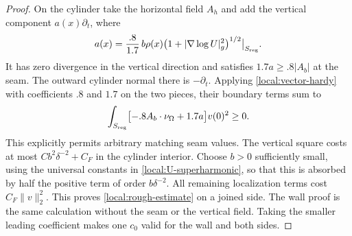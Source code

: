 \begin{proof}
On the cylinder take the horizontal field $A_h$ and add the vertical
component $a(x)\partial_t$, where
\[
 a(x)=\frac{.8}{1.7}\,b\rho(x)
               \bigl(1+|\nabla\log U|_g^2\bigr)^{1/2}
                 \big|_{S_{\rm reg}}.
\]
It has zero divergence in the vertical direction and satisfies
$1.7a\ge .8|A_b|$ at the seam.  The outward cylinder normal there is
$-\partial_t$.  Applying \eqref{local:vector-hardy} with coefficients
$.8$ and $1.7$ on the two pieces, their boundary terms sum to
\[
 \int_{S_{\rm reg}}
       \bigl[-.8 A_b\cdot\nu_\Omega+1.7a\bigr]v(0)^2\ge0.
\]
This explicitly permits arbitrary matching seam values.  The
vertical square costs at most $C b^2\delta^{-2}+C_F$ in the
cylinder interior.  Choose $b>0$ sufficiently small, using the
universal constants in \eqref{local:U-superharmonic}, so that this
is absorbed by half the positive term of order $b\delta^{-2}$.
All remaining localization terms cost $C_F\|v\|_2^2$.
This proves \eqref{local:rough-estimate} on a joined side.  The
wall proof is the same calculation without the seam or the vertical
field.  Taking the smaller leading coefficient makes one $c_0$
valid for the wall and both sides.
\end{proof}

